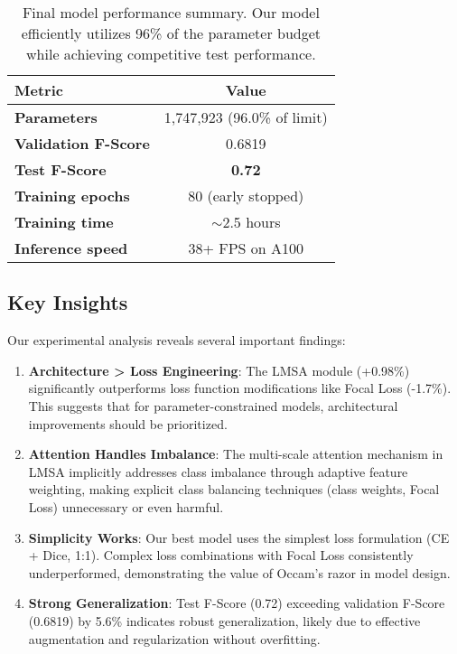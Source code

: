 \begin{table}[h]
\centering
\small
\begin{tabular}{lc}
\hline
Metric & Value \\
\hline
\textbf{Parameters} & 1,747,923 (96.0\% of limit) \\
\textbf{Validation F-Score} & 0.6819 \\
\textbf{Test F-Score} & \textbf{0.72} \\
\textbf{Training epochs} & 80 (early stopped) \\
\textbf{Training time} & $\sim$2.5 hours \\
\textbf{Inference speed} & 38+ FPS on A100 \\
\hline
\end{tabular}
\caption{Final model performance summary. Our model efficiently utilizes 96\% of the parameter budget while achieving competitive test performance.}
\end{table}

\subsection{Key Insights}

Our experimental analysis reveals several important findings:

\begin{enumerate}
    \item \textbf{Architecture > Loss Engineering}: The LMSA module (+0.98\%) significantly outperforms loss function modifications like Focal Loss (-1.7\%). This suggests that for parameter-constrained models, architectural improvements should be prioritized.

    \item \textbf{Attention Handles Imbalance}: The multi-scale attention mechanism in LMSA implicitly addresses class imbalance through adaptive feature weighting, making explicit class balancing techniques (class weights, Focal Loss) unnecessary or even harmful.

    \item \textbf{Simplicity Works}: Our best model uses the simplest loss formulation (CE + Dice, 1:1). Complex loss combinations with Focal Loss consistently underperformed, demonstrating the value of Occam's razor in model design.

    \item \textbf{Strong Generalization}: Test F-Score (0.72) exceeding validation F-Score (0.6819) by 5.6\% indicates robust generalization, likely due to effective augmentation and regularization without overfitting.
\end{enumerate}
